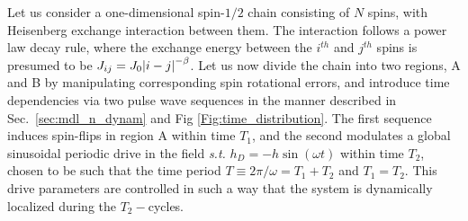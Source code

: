 \documentclass[12pt]{iopart}
\begin{document}
Let us consider a one-dimensional spin-$1/2$ chain consisting of $N$ spins, with Heisenberg exchange interaction between them. The interaction follows a power law decay rule, where the exchange energy between the $i^{th}$ and $j^{th}$ spins is presumed to be  $J_{ij}=J_0\abs{i-j}^{-\beta}$. Let us now  divide the chain into two regions, A and B by manipulating corresponding spin rotational errors, and introduce time dependencies via two pulse wave sequences in the manner described in Sec.~\ref{sec:mdl_n_dynam} and Fig \ref{Fig:time_distribution}. The first sequence  induces spin-flips in region A within time $T_1$, and the second modulates a global sinusoidal periodic drive in the field \textit{s.t.} $h_D = -h\sin(\omega t)$ within time $T_2$, chosen to be such that the time period $T\equiv 2\pi/\omega = T_1 + T_2$ and $T_1 = T_2$. This drive parameters are controlled in such a way that the system is dynamically localized during the $T_2-$cycles.
\end{document}
